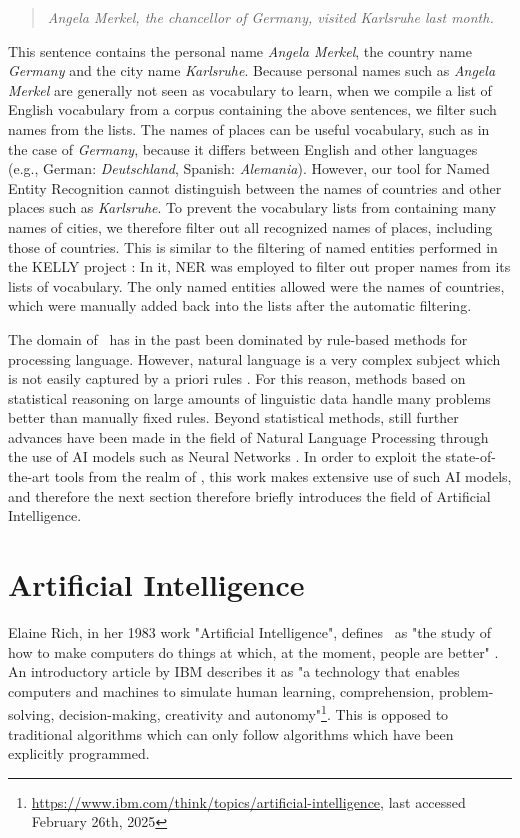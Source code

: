 \begin{quote}
	\textit{Angela Merkel, the chancellor of Germany, visited Karlsruhe last month.}
\end{quote}

This sentence contains the personal name \textit{Angela Merkel}, the country name \textit{Germany} and the city name \textit{Karlsruhe}.
Because personal names such as \textit{Angela Merkel} are generally not seen as vocabulary to learn, when we compile a list of English vocabulary from a corpus containing the above sentences, we filter such names from the lists.
The names of places can be useful vocabulary, such as in the case of \textit{Germany}, because it differs between English and other languages (e.g., German: \textit{Deutschland}, Spanish: \textit{Alemania}).
However, our tool for Named Entity Recognition cannot distinguish between the names of countries and other places such as \textit{Karlsruhe}.
To prevent the vocabulary lists from containing many names of cities, we therefore filter out all recognized names of places, including those of countries.
This is similar to the filtering of named entities performed in the KELLY project \cite{kokkinakisCorpusbasedApproachesCreation2011}:
In it, NER was employed to filter out proper names from its lists of vocabulary.
The only named entities allowed were the names of countries, which were manually added back into the lists after the automatic filtering.


The domain of \NLP\ has in the past been dominated by rule-based methods for processing language.
However, natural language is a very complex subject which is not easily captured by a priori rules \cite{jurafskySpeechLanguageProcessing2025a}.
For this reason, methods based on statistical reasoning on large amounts of linguistic data handle many problems better than manually fixed rules.
Beyond statistical methods, still further advances have been made in the field of Natural Language Processing through the use of AI models such as Neural Networks \cite{jurafskySpeechLanguageProcessing2025a}.
In order to exploit the state-of-the-art tools from the realm of \NLP, this work makes extensive use of such AI models, and therefore the next section therefore briefly introduces the field of Artificial Intelligence.

\section{Artificial Intelligence}
Elaine Rich, in her 1983 work "Artificial Intelligence", defines \AI\ as "the study of how to make computers do things at which, at the moment, people are better" \cite{rich1983artificial}.
An introductory article by IBM describes it as "a technology that enables computers and machines to simulate human learning, comprehension, problem-solving, decision-making, creativity and autonomy"\footnote{\url{https://www.ibm.com/think/topics/artificial-intelligence}, last accessed February 26th, 2025}.
This is opposed to traditional algorithms which can only follow algorithms which have been explicitly programmed.

